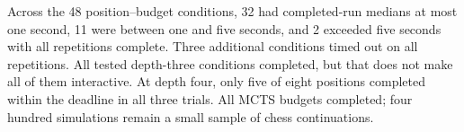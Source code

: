 Across the 48 position--budget conditions, 32 had completed-run medians at most one second, 11 were between one and five seconds, and 2 exceeded five seconds with all repetitions complete. Three additional conditions timed out on all repetitions. All tested depth-three conditions completed, but that does not make all of them interactive. At depth four, only five of eight positions completed within the deadline in all three trials. All MCTS budgets completed; four hundred simulations remain a small sample of chess continuations.
